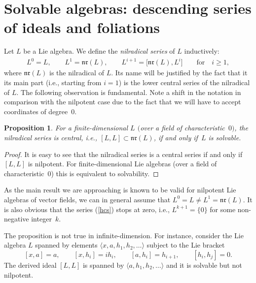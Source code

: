 \documentclass[pdftex]{sigma}
\numberwithin{equation}{section}
\newtheorem{Proposition}[Theorem]{Proposition}
 { \theoremstyle{definition}
\newtheorem{Definition}[Theorem]{Definition}
\newtheorem{Example}[Theorem]{Example}
\newtheorem{Remark}[Theorem]{Remark} }
\begin{document}
\section{Solvable algebras: descending series of ideals and foliations}
Let $L$ be a Lie algebra. We define the \emph{nilradical series} of $L$ inductively:
\begin{gather}\label{hcs} L^0=L ,\qquad L^1=\mathfrak{nr}(L) , \qquad L^{i+1}=\big[\mathfrak{nr}(L),L^i\big]\qquad \text{for}\quad i\ge 1 ,
\end{gather}
where $\mathfrak{nr}(L)$ is the nilradical of $L$.
Its name will be justified by the fact that it its main part (i.e., starting from $i=1$) is the lower central series of the nilradical of $L$. The following observation is fundamental. Note a shift in the notation in comparison with the nilpotent case due to the fact that we will have to accept coordinates of degree~$0$.
\begin{Proposition}
For a finite-dimensional $L$ $($over a field of characteristic~$0)$, the nilradical series is central, i.e., $[L,L]\subset\mathfrak{nr}(L)$, if and only if~$L$ is solvable.
\end{Proposition}
\begin{proof}
It is easy to see that the nilradical series is a central series if and only if $[L,L]$ is nilpotent. For finite-dimensional Lie algebras (over a field of characteristic~$0$) this is equivalent to solvability.
\end{proof}
\begin{Remark}
As the main result we are approaching is known to be valid for nilpotent Lie algebras of vector fields, we can in general assume that $L^0=L\ne L^1=\mathfrak{nr}(L)$. It is also obvious that the series (\ref{hcs}) stops at zero, i.e., $L^{k+1}=\{ 0\}$ for some non-negative integer~$k$.
\end{Remark}
\begin{Example} The proposition is not true in infinite-dimension. For instance, consider the Lie algebra $L$ spanned by elements $\langle x,a,h_1,h_2,\dots\rangle$ subject to the Lie bracket
\[ [x,a]=a ,\qquad [x,h_i]=ih_i ,\qquad [a,h_i]=h_{i+1} ,\qquad [h_i,h_j]=0 .\]
The derived ideal $[L,L]$ is spanned by $\langle a,h_1,h_2,\dots\rangle$ and it is solvable but not nilpotent.
\end{Example}
\end{document}
